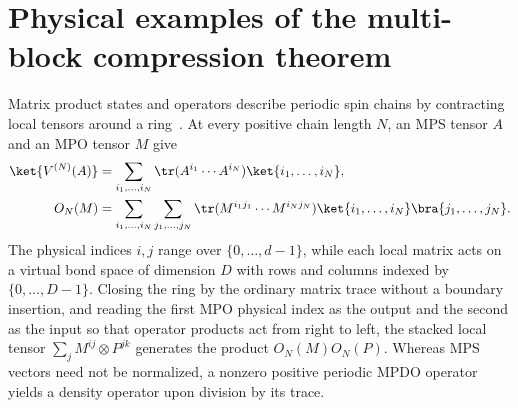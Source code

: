 
\chapter{Physical examples of the multi-block compression theorem}%
\label{ch:asymmetric_examples}

Matrix product states and operators describe periodic spin chains by
contracting local tensors around a ring~\cite{Cirac2021Matrix}. At every
positive chain length $N$, an MPS tensor $A$ and an MPO tensor $M$ give
\begin{align}
    \ket{V^{(N)}(A)}
     & =\sum_{i_1,\ldots,i_N}\tr(A^{i_1}\cdots A^{i_N})
    \ket{i_1,\ldots,i_N}, \notag                        \\
    O_N(M)
     & =\sum_{i_1,\ldots,i_N}\sum_{j_1,\ldots,j_N}
    \tr(M^{i_1j_1}\cdots M^{i_Nj_N})
    \ket{i_1,\ldots,i_N}\bra{j_1,\ldots,j_N}.
    \notag
\end{align}
The physical indices $i,j$ range over $\{0,\ldots,d-1\}$, while each
local matrix acts on a virtual bond space of dimension $D$ with rows
and columns indexed by $\{0,\ldots,D-1\}$. Closing the ring by the
ordinary matrix trace without a boundary insertion, and reading the
first MPO physical index as the output and the second as the input so
that operator products act from right to left, the stacked local tensor
$\sum_jM^{ij}\otimes P^{jk}$ generates the product $O_N(M)O_N(P)$.
Whereas MPS vectors need not be normalized, a nonzero positive
periodic MPDO operator yields a density operator upon division by its
trace.


